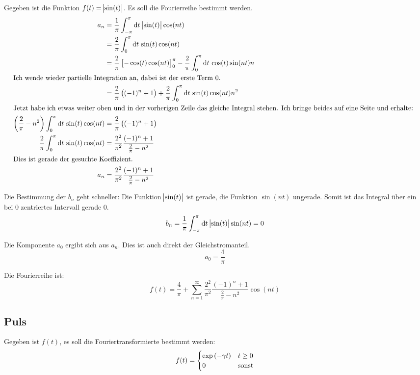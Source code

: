 Gegeben ist die Funktion $f(t) = \abs{\sin(t)}$. Es soll die Fourierreihe bestimmt werden.
\begin{align*}
	a_n
	&= \frac 1\pi \int_{-\pi}^\pi \dif t \, \abs{\sin(t)} \cos(nt) \\
	&= \frac 2\pi \int_0^\pi \dif t \, \sin(t) \cos(nt) \\
	&= \frac 2\pi \sbr{-\cos(t) \cos(nt)}_0^\pi - \frac 2\pi \int_0^\pi \dif t \, \cos(t) \sin(nt) n \\
	\intertext{%
		Ich wende wieder partielle Integration an, dabei ist der erste Term 0.
	}
	&= \frac 2\pi \del{(-1)^n+1} + \frac 2\pi \int_0^\pi \dif t \, \sin(t) \cos(nt) n^2 \\
	\intertext{%
		Jetzt habe ich etwas weiter oben und in der vorherigen Zeile das
		gleiche Integral stehen. Ich bringe beides auf eine Seite und erhalte:
	}
	\del{\frac 2\pi - n^2} \int_0^\pi \dif t \, \sin(t) \cos(nt) &= \frac 2\pi \del{(-1)^n+1} \\
							   \frac 2\pi \int_0^\pi \dif t \, \sin(t) \cos(nt) &= \frac{2^2}{\pi^2} \frac{(-1)^n+1}{\frac 2\pi - n^2} \\
	\intertext{%
		Dies ist gerade der gesuchte Koeffizient.
	}
							   a_n &= \frac{2^2}{\pi^2} \frac{(-1)^n+1}{\frac 2\pi - n^2}
\end{align*}

Die Bestimmung der $b_n$ geht schneller: Die Funktion $\abs{\sin(t)}$ ist
gerade, die Funktion $\sin(nt)$ ungerade. Somit ist das Integral über ein bei
0 zentriertes Intervall gerade 0.
\[
	b_n = \frac 1\pi \int_{-\pi}^\pi \dif t \, \abs{\sin(t)} \sin(nt) = 0
\]

Die Komponente $a_0$ ergibt sich aus $a_n$. Dies ist auch direkt der Gleichstromanteil.
\[
	a_0 = \frac 4\pi
\]

Die Fourierreihe ist:
\[
	f(t) = \frac 4 \pi + \sum_{n = 1}^\infty \frac{2^2}{\pi^2} \frac{(-1)^n+1}{\frac 2\pi - n^2} \cos(nt)
\]

\subsection{Puls}

Gegeben ist $f(t)$, es soll die Fouriertransformierte bestimmt werden:
\[
	f(t) = \begin{cases}
		\exp\del{-\gamma t} & t \geq 0 \\
									  0 & \text{sonst}
	\end{cases}
\]

